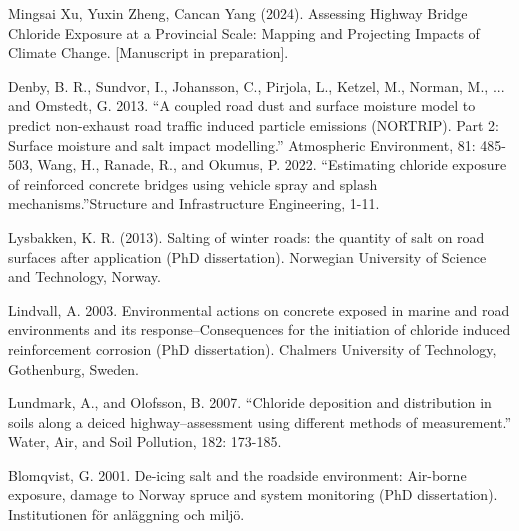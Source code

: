 \documentclass[12pt]{article}
\newcounter{refnum} %
\begin{document}
\begin{enumerate}[label={[\arabic*]}]
\item {} \label{ref7}
Mingsai Xu, Yuxin Zheng, Cancan Yang (2024). Assessing Highway Bridge Chloride Exposure at a Provincial Scale: Mapping and Projecting Impacts of Climate Change.  [Manuscript in preparation].

\item {} \label{ref8}
Denby, B. R., Sundvor, I., Johansson, C., Pirjola, L., Ketzel, M., Norman, M., ... and Omstedt, G. 2013. “A coupled road dust and surface moisture model to predict non-exhaust road traffic induced particle emissions (NORTRIP). Part 2: Surface moisture and salt impact modelling.” Atmospheric Environment, 81: 485-503, Wang, H., Ranade, R., and Okumus, P. 2022. “Estimating chloride exposure of reinforced concrete bridges using vehicle spray and splash mechanisms.”Structure and Infrastructure Engineering, 1-11. 

\item {} \label{ref9}
Lysbakken, K. R. (2013). Salting of winter roads: the quantity of salt on road surfaces after application (PhD dissertation). Norwegian University of Science and Technology, Norway.

\item {} \label{ref10}
Lindvall, A. 2003. Environmental actions on concrete exposed in marine and road environments and its response–Consequences for the initiation of chloride induced reinforcement corrosion (PhD dissertation). Chalmers University of Technology, Gothenburg, Sweden.

\item {} \label{ref11}
Lundmark, A., and Olofsson, B. 2007. “Chloride deposition and distribution in soils along a deiced highway–assessment using different methods of measurement.” Water, Air, and Soil Pollution, 182: 173-185.

\item {} \label{ref12}
Blomqvist, G. 2001. De-icing salt and the roadside environment: Air-borne exposure, damage to Norway spruce and system monitoring (PhD dissertation). Institutionen för anläggning och miljö.

\end{enumerate}


\newpage

\noindent {}
\end{document}
